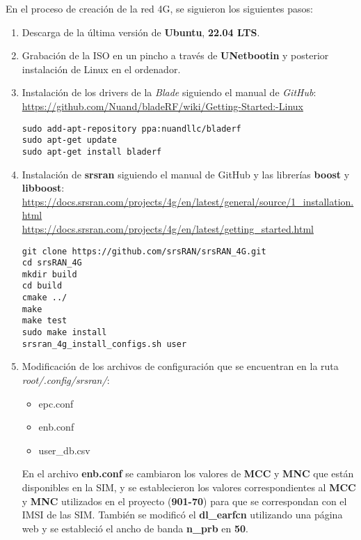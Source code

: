 En el proceso de creación de la red 4G, se siguieron los siguientes pasos:

\begin{enumerate}
\item Descarga de la última versión de \textbf{Ubuntu}, \textbf{22.04 LTS}.
\item Grabación de la ISO en un pincho a través de \textbf{UNetbootin} y posterior instalación de Linux en el ordenador.
\item Instalación de los drivers de la \textit{Blade} siguiendo el manual de \textit{GitHub}:\\
 \url{https://github.com/Nuand/bladeRF/wiki/Getting-Started:-Linux}

\begin{lstlisting}
sudo add-apt-repository ppa:nuandllc/bladerf
sudo apt-get update
sudo apt-get install bladerf
\end{lstlisting}

\item Instalación de \textbf{srsran} siguiendo el manual de GitHub y las librerías \textbf{boost} y \textbf{libboost}:\\
\url{https://docs.srsran.com/projects/4g/en/latest/general/source/1_installation.html}\\
\url{https://docs.srsran.com/projects/4g/en/latest/getting_started.html}

\begin{lstlisting}
git clone https://github.com/srsRAN/srsRAN_4G.git
cd srsRAN_4G
mkdir build
cd build
cmake ../
make
make test
sudo make install
srsran_4g_install_configs.sh user
\end{lstlisting}

\item Modificación de los archivos de configuración que se encuentran en la ruta \textit{root/.config/srsran/}:
\begin{itemize}
	\item epc.conf
	\item enb.conf
	\item user_db.csv
\end{itemize}

En el archivo \textbf{enb.conf} se cambiaron los valores de \textbf{MCC} y \textbf{MNC} que están disponibles en la SIM, y se establecieron los valores correspondientes al \textbf{MCC} y \textbf{MNC} utilizados en el proyecto (\textbf{901-70}) para que se correspondan con el IMSI de las SIM. También se modificó el \textbf{dl_earfcn} utilizando una página web y se estableció el ancho de banda \textbf{n_prb} en \textbf{50}.\\


\end{enumerate}
